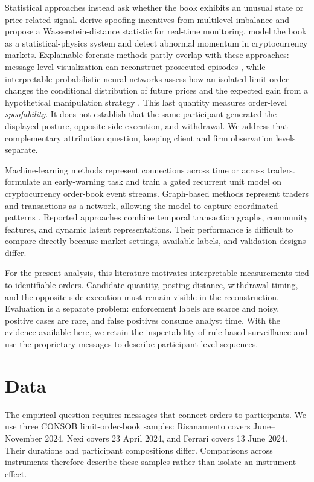 \documentclass[11pt]{article}
\begin{document}
Statistical approaches instead ask whether the book exhibits an unusual state or price-related signal. \cite{TaoDayLingDrapeau2022} derive spoofing incentives from multilevel imbalance and propose a Wasserstein-distance statistic for real-time monitoring. \cite{LiPolukarovaVentre2023} model the book as a statistical-physics system and detect abnormal momentum in cryptocurrency markets. Explainable forensic methods partly overlap with these approaches: message-level visualization can reconstruct prosecuted episodes \cite{DebieEtAl2023}, while interpretable probabilistic neural networks assess how an isolated limit order changes the conditional distribution of future prices and the expected gain from a hypothetical manipulation strategy \cite{FabreChallet2025}. This last quantity measures order-level \emph{spoofability}. It does not establish that the same participant generated the displayed posture, opposite-side execution, and withdrawal. We address that complementary attribution question, keeping client and firm observation levels separate.

Machine-learning methods represent connections across time or across traders. \cite{TuccellaNadlerSerban2021} formulate an early-warning task and train a gated recurrent unit model on cryptocurrency order-book event streams. Graph-based methods represent traders and transactions as a network, allowing the model to capture coordinated patterns \cite{KangMuNing2023,KangMuNing2024,XiangEtAl2025}. Reported approaches combine temporal transaction graphs, community features, and dynamic latent representations. Their performance is difficult to compare directly because market settings, available labels, and validation designs differ.

For the present analysis, this literature motivates interpretable measurements tied to identifiable orders. Candidate quantity, posting distance, withdrawal timing, and the opposite-side execution must remain visible in the reconstruction. Evaluation is a separate problem: enforcement labels are scarce and noisy, positive cases are rare, and false positives consume analyst time. With the evidence available here, we retain the inspectability of rule-based surveillance and use the proprietary messages to describe participant-level sequences.

\section{Data}
\label{sec:data}

The empirical question requires messages that connect orders to participants. We use three CONSOB limit-order-book samples: Risanamento covers June--November 2024, Nexi covers 23 April 2024, and Ferrari covers 13 June 2024. Their durations and participant compositions differ. Comparisons across instruments therefore describe these samples rather than isolate an instrument effect.
\end{document}
